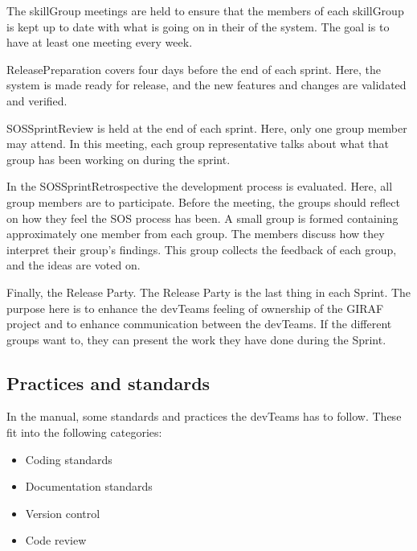 The \Gls{skillGroup} meetings are held to ensure that the members of each \gls{skillGroup} is kept up to date with what is going on in their of the system. The goal is to have at least one meeting every week. 

\Gls{ReleasePreparation} covers four days before the end of each sprint. Here, the system is made ready for release, and the new features and changes are validated and verified. 

\Gls{SOSSprintReview} is held at the end of each sprint. Here, only one group member may attend. In this meeting, each group representative talks about what that group has been working on during the sprint.

In the \gls{SOSSprintRetrospective} the development process is evaluated. Here, all group members are to participate. Before the meeting, the groups should reflect on how they feel the \gls{SOS} process has been. A small group is formed containing approximately one member from each group. The members discuss how they interpret their group's findings. This group collects the feedback of each group, and the ideas are voted on. 

Finally, the Release Party. The Release Party is the last thing in each Sprint. The purpose here is to enhance the \glspl{devTeam} feeling of ownership of the GIRAF project and to enhance communication between the \glspl{devTeam}. If the different groups want to, they can present the work they have done during the Sprint.

\subsection{Practices and standards} 
In the manual, some standards and practices the \glspl{devTeam} has to follow. These fit into the following categories:
\begin{itemize}
    \item Coding standards
    \item Documentation standards
    \item Version control
    \item Code review
\end{itemize}

